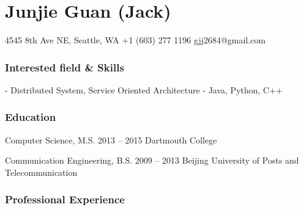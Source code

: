 \documentclass{tccv}
\begin{document}
\part{Junjie Guan (Jack)}
	
\begin{multicols}{2}

\personal
    {4545 8th Ave NE, Seattle, WA}
    {+1 (603) 277 1196}
    {gjj2684@gmail.com}

\section{Interested field \& Skills}
- Distributed System, Service Oriented Architecture	
- Java, Python, C++



\section{Education}

\begin{yearlist}

\item[Computer Science, M.S.]{2013 -- 2015}
     {Dartmouth College}

\item[Communication Engineering, B.S.]{2009 -- 2013}
     {Beijing University of Posts and Telecommunication}

\end{yearlist}






\end{multicols}















\section{Professional Experience}
\end{document}
